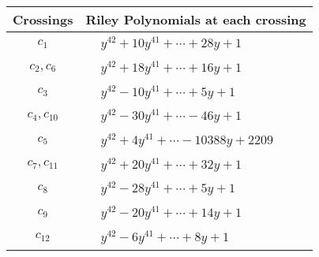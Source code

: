 \documentclass[1p]{elsarticle_modified}
\theoremstyle{definition}
\begin{document}
\begin{tabular}{m{50pt}|m{274pt}}
Crossings & \hspace{64pt}Riley Polynomials at each crossing \\
\hline $$\begin{aligned}c_{1}\end{aligned}$$&$\begin{aligned}
&y^{42}+10 y^{41}+\cdots+28 y+1
\end{aligned}$\\
\hline $$\begin{aligned}c_{2},c_{6}\end{aligned}$$&$\begin{aligned}
&y^{42}+18 y^{41}+\cdots+16 y+1
\end{aligned}$\\
\hline $$\begin{aligned}c_{3}\end{aligned}$$&$\begin{aligned}
&y^{42}-10 y^{41}+\cdots+5 y+1
\end{aligned}$\\
\hline $$\begin{aligned}c_{4},c_{10}\end{aligned}$$&$\begin{aligned}
&y^{42}-30 y^{41}+\cdots-46 y+1
\end{aligned}$\\
\hline $$\begin{aligned}c_{5}\end{aligned}$$&$\begin{aligned}
&y^{42}+4 y^{41}+\cdots-10388 y+2209
\end{aligned}$\\
\hline $$\begin{aligned}c_{7},c_{11}\end{aligned}$$&$\begin{aligned}
&y^{42}+20 y^{41}+\cdots+32 y+1
\end{aligned}$\\
\hline $$\begin{aligned}c_{8}\end{aligned}$$&$\begin{aligned}
&y^{42}-28 y^{41}+\cdots+5 y+1
\end{aligned}$\\
\hline $$\begin{aligned}c_{9}\end{aligned}$$&$\begin{aligned}
&y^{42}-20 y^{41}+\cdots+14 y+1
\end{aligned}$\\
\hline $$\begin{aligned}c_{12}\end{aligned}$$&$\begin{aligned}
&y^{42}-6 y^{41}+\cdots+8 y+1
\end{aligned}$\\
\hline
\end{tabular}\\~\\
\end{document}
